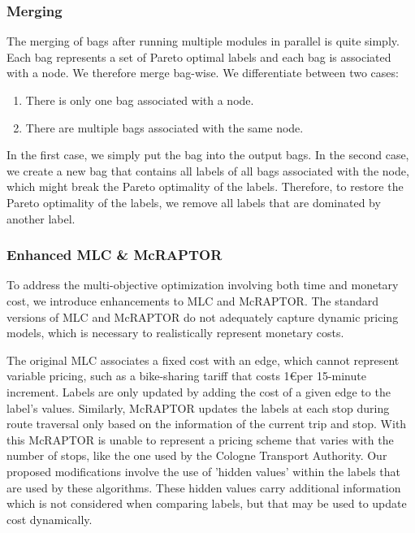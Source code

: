 \subsubsection{Merging}
\label{subsubsec:merging}

The merging of bags after running multiple modules in parallel is quite simply.
Each bag represents a set of Pareto optimal labels and each bag is associated with a node.
We therefore merge bag-wise.
We differentiate between two cases:
\begin{enumerate}
    \item There is only one bag associated with a node.
    \item There are multiple bags associated with the same node.
\end{enumerate}
In the first case, we simply put the bag into the output bags.
In the second case, we create a new bag that contains all labels of all bags associated with the node, which might break the Pareto optimality of the labels.
Therefore, to restore the Pareto optimality of the labels, we remove all labels that are dominated by another label.

\subsubsection{Enhanced MLC \& McRAPTOR}
\label{subsubsec:enhanced_mlc_and_mcraptor}

To address the multi-objective optimization involving both time and monetary cost, we introduce enhancements to MLC and McRAPTOR. 
The standard versions of MLC and McRAPTOR do not adequately capture dynamic pricing models, which is necessary to realistically represent monetary costs.

The original MLC associates a fixed cost with an edge, which cannot represent variable pricing, such as a bike-sharing tariff that costs 1\euro per 15-minute increment. 
Labels are only updated by adding the cost of a given edge to the label's values.
Similarly, McRAPTOR updates the labels at each stop during route traversal only based on the information of the current trip and stop. 
With this McRAPTOR is unable to represent a pricing scheme that varies with the number of stops, like the one used by the Cologne Transport Authority.
Our proposed modifications involve the use of 'hidden values' within the labels that are used by these algorithms. 
These hidden values carry additional information which is not considered when comparing labels, but that may be used to update cost dynamically.

